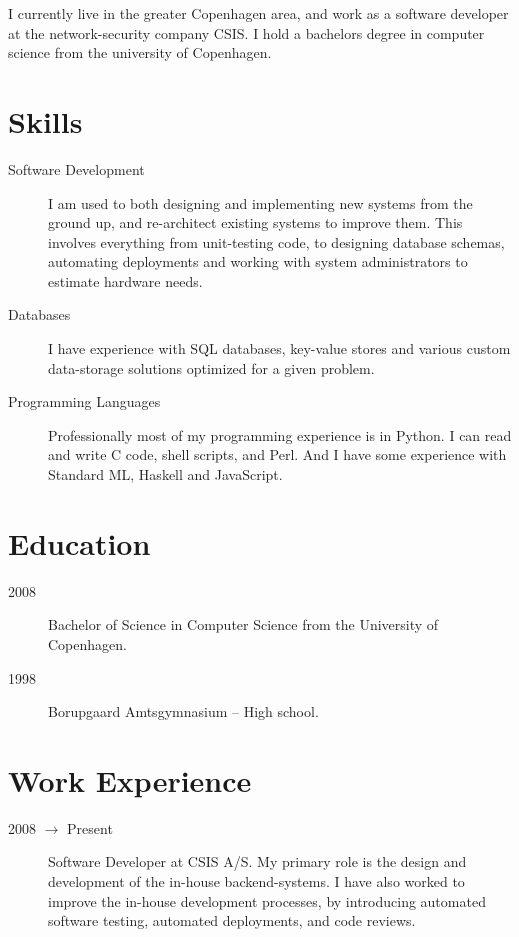 \documentclass[margin,line,a4paper]{resume}
\begin{document}
\begin{resume}
I currently live in the greater Copenhagen area, and work as a software
developer at the network-security company CSIS. I hold a bachelors degree in
computer science from the university of Copenhagen.

\section{\mysidestyle Skills}\vspace{1mm}
\begin{description}
\item[Software Development] I am used to both designing and implementing new
systems from the ground up, and re-architect existing systems to improve them.
This involves everything from unit-testing code, to designing database
schemas, automating deployments and working with system administrators to
estimate hardware needs.
\item[Databases] I have experience with SQL databases, key-value stores and
various custom data-storage solutions optimized for a given problem.
\item[Programming Languages] Professionally most of my programming experience
is in Python. I can read and write C code, shell scripts, and Perl.  And I
have some experience with Standard ML, Haskell and JavaScript.
\end{description}

\section{\mysidestyle Education}\vspace{1mm}
\begin{description}
\item[2008] Bachelor of Science in Computer Science from
the University of Copenhagen.
\item[1998] Borupgaard Amtsgymnasium -- High school.
\end{description}

\section{\mysidestyle Work Experience}\vspace{1mm}
\begin{description}
\item[2008 $\rightarrow$ Present] Software Developer at CSIS A/S. My primary
role is the design and development of the in-house backend-systems.  I have
also worked to improve the in-house development processes, by introducing
automated software testing, automated deployments, and code reviews.


\end{description}
\end{resume}
\end{document}
